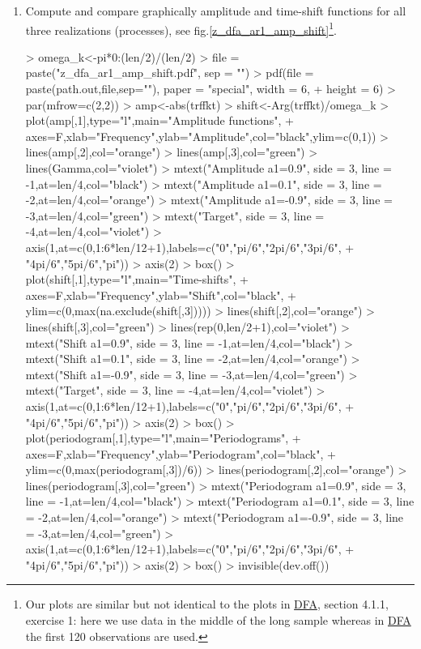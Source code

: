 \documentclass[a4paper]{book}
\begin{document}
\begin{enumerate}
\item Compute and compare graphically amplitude and time-shift functions for all three realizations (processes), see fig.\ref{z_dfa_ar1_amp_shift}\footnote{Our plots are similar but not identical to the plots in \href{http://blog.zhaw.ch/sef/files/2014/10/DFA.pdf}{DFA}, section 4.1.1, exercise 1: here we use data in the middle of the long sample whereas in \href{http://blog.zhaw.ch/sef/files/2014/10/DFA.pdf}{DFA} the first 120 observations are used.}.
\begin{Schunk}
\begin{Sinput}
> omega_k<-pi*0:(len/2)/(len/2)
> file = paste("z_dfa_ar1_amp_shift.pdf", sep = "")
> pdf(file = paste(path.out,file,sep=""), paper = "special", width = 6, 
+     height = 6)
> par(mfrow=c(2,2))
> amp<-abs(trffkt)
> shift<-Arg(trffkt)/omega_k
> plot(amp[,1],type="l",main="Amplitude functions",
+ axes=F,xlab="Frequency",ylab="Amplitude",col="black",ylim=c(0,1))
> lines(amp[,2],col="orange")
> lines(amp[,3],col="green")
> lines(Gamma,col="violet")
> mtext("Amplitude a1=0.9", side = 3, line = -1,at=len/4,col="black")
> mtext("Amplitude a1=0.1", side = 3, line = -2,at=len/4,col="orange")
> mtext("Amplitude a1=-0.9", side = 3, line = -3,at=len/4,col="green")
> mtext("Target", side = 3, line = -4,at=len/4,col="violet")
> axis(1,at=c(0,1:6*len/12+1),labels=c("0","pi/6","2pi/6","3pi/6",
+ "4pi/6","5pi/6","pi"))
> axis(2)
> box()
> plot(shift[,1],type="l",main="Time-shifts",
+ axes=F,xlab="Frequency",ylab="Shift",col="black",
+ ylim=c(0,max(na.exclude(shift[,3]))))
> lines(shift[,2],col="orange")
> lines(shift[,3],col="green")
> lines(rep(0,len/2+1),col="violet")
> mtext("Shift a1=0.9", side = 3, line = -1,at=len/4,col="black")
> mtext("Shift a1=0.1", side = 3, line = -2,at=len/4,col="orange")
> mtext("Shift a1=-0.9", side = 3, line = -3,at=len/4,col="green")
> mtext("Target", side = 3, line = -4,at=len/4,col="violet")
> axis(1,at=c(0,1:6*len/12+1),labels=c("0","pi/6","2pi/6","3pi/6",
+ "4pi/6","5pi/6","pi"))
> axis(2)
> box()
> plot(periodogram[,1],type="l",main="Periodograms",
+ axes=F,xlab="Frequency",ylab="Periodogram",col="black",
+ ylim=c(0,max(periodogram[,3])/6))
> lines(periodogram[,2],col="orange")
> lines(periodogram[,3],col="green")
> mtext("Periodogram a1=0.9", side = 3, line = -1,at=len/4,col="black")
> mtext("Periodogram a1=0.1", side = 3, line = -2,at=len/4,col="orange")
> mtext("Periodogram a1=-0.9", side = 3, line = -3,at=len/4,col="green")
> axis(1,at=c(0,1:6*len/12+1),labels=c("0","pi/6","2pi/6","3pi/6",
+ "4pi/6","5pi/6","pi"))
> axis(2)
> box()
> invisible(dev.off())

\end{Sinput}
\end{Schunk}
\end{enumerate}
\end{document}
